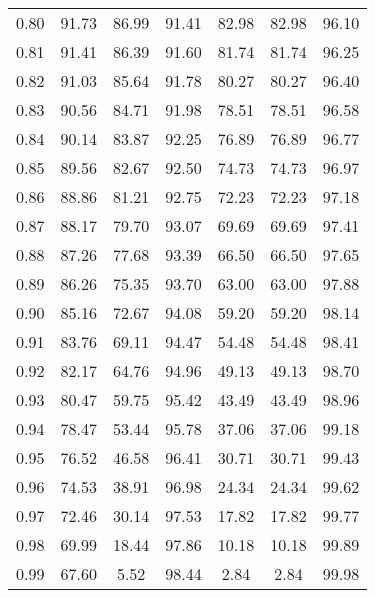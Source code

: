 \begin{tabular}{|c|c|c|c|c|c|c|}
      0.80 &     91.73 &     86.99 &      91.41 &   82.98 &      82.98 &         96.10 \\
      0.81 &     91.41 &     86.39 &      91.60 &   81.74 &      81.74 &         96.25 \\
      0.82 &     91.03 &     85.64 &      91.78 &   80.27 &      80.27 &         96.40 \\
      0.83 &     90.56 &     84.71 &      91.98 &   78.51 &      78.51 &         96.58 \\
      0.84 &     90.14 &     83.87 &      92.25 &   76.89 &      76.89 &         96.77 \\
      0.85 &     89.56 &     82.67 &      92.50 &   74.73 &      74.73 &         96.97 \\
      0.86 &     88.86 &     81.21 &      92.75 &   72.23 &      72.23 &         97.18 \\
      0.87 &     88.17 &     79.70 &      93.07 &   69.69 &      69.69 &         97.41 \\
      0.88 &     87.26 &     77.68 &      93.39 &   66.50 &      66.50 &         97.65 \\
      0.89 &     86.26 &     75.35 &      93.70 &   63.00 &      63.00 &         97.88 \\
      0.90 &     85.16 &     72.67 &      94.08 &   59.20 &      59.20 &         98.14 \\
      0.91 &     83.76 &     69.11 &      94.47 &   54.48 &      54.48 &         98.41 \\
      0.92 &     82.17 &     64.76 &      94.96 &   49.13 &      49.13 &         98.70 \\
      0.93 &     80.47 &     59.75 &      95.42 &   43.49 &      43.49 &         98.96 \\
      0.94 &     78.47 &     53.44 &      95.78 &   37.06 &      37.06 &         99.18 \\
      0.95 &     76.52 &     46.58 &      96.41 &   30.71 &      30.71 &         99.43 \\
      0.96 &     74.53 &     38.91 &      96.98 &   24.34 &      24.34 &         99.62 \\
      0.97 &     72.46 &     30.14 &      97.53 &   17.82 &      17.82 &         99.77 \\
      0.98 &     69.99 &     18.44 &      97.86 &   10.18 &      10.18 &         99.89 \\
      0.99 &     67.60 &      5.52 &      98.44 &    2.84 &       2.84 &         99.98 \\
\bottomrule
\end{tabular}
